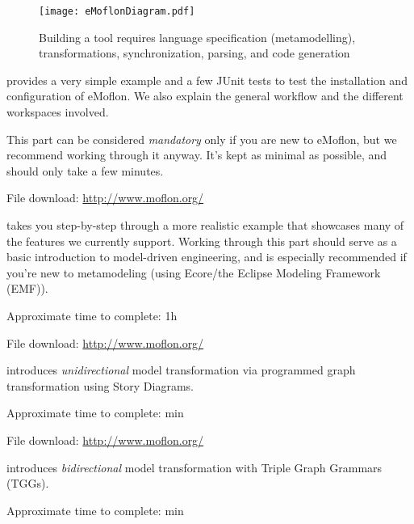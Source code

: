 \vspace*{2cm}
\begin{figure}[htbp]
	\centering
  \texttt{[image: eMoflonDiagram.pdf]}
	\caption{Building a tool requires language specification (metamodelling), transformations, synchronization, parsing, and code generation}
	\label{fig:transModel}
\end{figure}
\begin{description}

\pagebreak

\fancyfoot{}

\item[Part I: Installation and Set Up] provides a very simple example and a few JUnit tests to test the installation and configuration of eMoflon. We also
explain the general workflow and the different workspaces involved.

This part can be considered \emph{mandatory} only if you are new to eMoflon, but we recommend working through it anyway.
It's kept as minimal as possible, and should only take a few minutes.

{\small File download: \href{http://www.moflon.org/ }{http://www.moflon.org/}}

\item[Part II: Ecore] takes you step-by-step through a more realistic example that showcases many of the features we currently support.
Working through this part should serve as a basic introduction to model-driven engineering, and is especially recommended if you're new to metamodeling (using
Ecore/the Eclipse Modeling Framework (EMF)).

{\small Approximate time to complete: 1h
 
File download: \href{http://www.moflon.org/ }{http://www.moflon.org/}}

\item[Part III: Story Driven Modeling (SDM)] introduces \emph{unidirectional} model transformation via programmed graph transformation using Story Diagrams.

{\small Approximate time to complete: min 

File download: \href{http://www.moflon.org/ }{http://www.moflon.org/}}

\item[Part IV: TGGs] introduces \emph{bidirectional} model transformation with Triple Graph Grammars (TGGs).

{\small Approximate time to complete: min 

}
\end{description}

